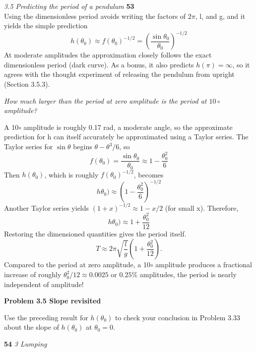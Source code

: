 \documentclass[a4paper, 11pt]{book}
\begin{document}
\noindent
\large\textit{3.5 Predicting the period of a pendulum} \hfill \textbf{53} \\

Using the dimensionless period avoids writing the factors of $2\pi$, l, and g, and it yields the simple prediction
\begin{equation}h(\theta_{0})\approx f(\theta_{0})^{{-1}/{2}}=\left( \frac{\sin\theta_{0}}{\theta_{0}} \right)^{{-1}/{2}}\end{equation}
At moderate amplitudes the approximation closely
follows the exact dimensionless period (dark curve). As a bonus, it also
predicts $h({\pi}) ={\infty}$, so it agrees with the thought experiment of releasing
the pendulum from upright (Section 3.5.3).

\textit{How much larger than the period at zero amplitude is the period at $10\circ$ amplitude?}

A 10$\circ$ amplitude is roughly 0.17 rad, a moderate angle, so the approximate
prediction for h can itself accurately be approximated using a Taylor series.
The Taylor series for $\sin\theta$ begins ${\theta}-{\theta^3/6}$, so
\begin{equation}f(\theta_{0})=\frac{\sin\theta_{0}}{\theta_{0}}\approx 1-\frac{\theta_{0}^2}{6}\end{equation}
Then $h(\theta_{0})$, which is roughly $f(\theta_{0})^{{-1}/{2}}$, becomes
\begin{equation}h\theta_{0})\approx \left(1-\frac{\theta_{0}^2}{6} \right)^{{-1}/{2}}\end{equation}
Another Taylor series yields $(1+x)^{{-1}/{2}}\approx 1 − x/2$ (for small x). Therefore,
\begin{equation}h\theta_{0})\approx 1+\frac{\theta_{0}^2}{12}\end{equation}
Restoring the dimensioned quantities gives the period itself.
\begin{equation}T\approx 2\pi\sqrt{\frac{l}{g}}\left(1+\frac{\theta_{0}^2}{12}\right).\end{equation}
Compared to the period at zero amplitude, a 10$\circ$ amplitude produces a
fractional increase of roughly $\theta_{0}^2/12 \approx 0.0025$ or $0.25\%$
amplitudes, the period is nearly independent of amplitude!

\colorbox{light-gray}{
\begin{minipage}{\textwidth}
\textbf {Problem 3.5 Slope revisited}

Use the preceding result for $h(\theta_{0})$ to check your conclusion in Problem 3.33
about the slope of $h(\theta_{0})$ at $\theta_{0}= 0$.
\end{minipage}
}
\newpage
\noindent
\large\textbf{54} \hfill \textit{3 Lumping} \\
\end{document}

